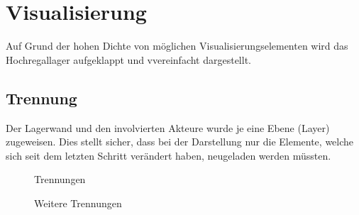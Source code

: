 \section{Visualisierung}
Auf Grund der hohen Dichte von möglichen Visualisierungselementen wird das Hochregallager aufgeklappt und  vvereinfacht dargestellt.

%
\subsection{Trennung}
Der Lagerwand und den involvierten Akteure wurde je eine Ebene (Layer) zugeweisen. Dies stellt sicher, dass bei der Darstellung nur die Elemente, welche sich seit dem letzten Schritt verändert haben, neugeladen werden müssten.  

%
\begin{figure}
\hfill
{}\hfill
{}
\caption{Trennungen}
\end{figure}

\begin{figure}
\hfill
{}
\caption{Weitere Trennungen}
\end{figure}
%

